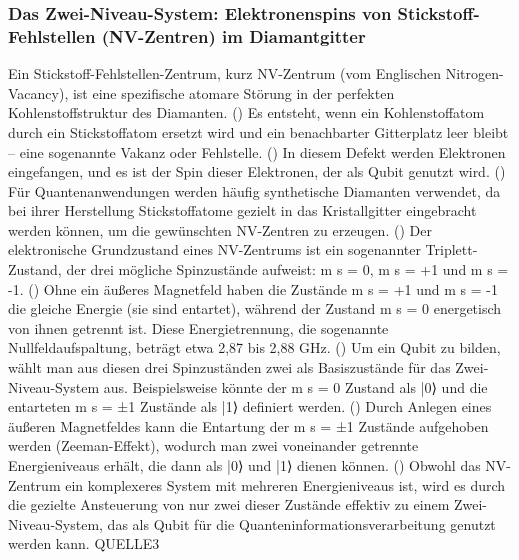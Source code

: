 \subsubsection{Das Zwei-Niveau-System: Elektronenspins von Stickstoff-Fehlstellen (NV-Zentren) im Diamantgitter}
Ein Stickstoff-Fehlstellen-Zentrum, kurz NV-Zentrum (vom Englischen Nitrogen-Vacancy), ist eine spezifische atomare Störung in der perfekten Kohlenstoffstruktur des Diamanten. (\cite{StickstoffFehlstellenZentrum2025}) Es entsteht, wenn ein Kohlenstoffatom durch ein Stickstoffatom ersetzt wird und ein benachbarter Gitterplatz leer bleibt – eine sogenannte Vakanz oder Fehlstelle. (\cite{StickstoffFehlstellenZentrum2025}) In diesem Defekt werden Elektronen eingefangen, und es ist der Spin dieser Elektronen, der als Qubit genutzt wird. (\cite{StickstoffFehlstellenZentrum2025}) Für Quantenanwendungen werden häufig synthetische Diamanten verwendet, da bei ihrer Herstellung Stickstoffatome gezielt in das Kristallgitter eingebracht werden können, um die gewünschten NV-Zentren zu erzeugen. (\cite{StickstoffFehlstellenZentrum2025})
Der elektronische Grundzustand eines NV-Zentrums ist ein sogenannter Triplett-Zustand, der drei mögliche Spinzustände aufweist: m s = 0, m s = +1 und m s = -1. (\cite{StickstoffFehlstellenZentrum2025}) Ohne ein äußeres Magnetfeld haben die Zustände m s = +1 und m s = -1 die gleiche Energie (sie sind entartet), während der Zustand m s = 0 energetisch von ihnen getrennt ist. Diese Energietrennung, die sogenannte Nullfeldaufspaltung, beträgt etwa 2,87 bis 2,88 GHz. (\cite{StickstoffFehlstellenZentrum2025})
Um ein Qubit zu bilden, wählt man aus diesen drei Spinzuständen zwei als Basiszustände für das Zwei-Niveau-System aus. Beispielsweise könnte der m s = 0 Zustand als |0⟩ und die entarteten m s = ±1 Zustände als |1⟩ definiert werden. (\cite{StickstoffFehlstellenZentrum2025}) Durch Anlegen eines äußeren Magnetfeldes kann die Entartung der m s = ±1 Zustände aufgehoben werden (Zeeman-Effekt), wodurch man zwei voneinander getrennte Energieniveaus erhält, die dann als |0⟩ und |1⟩ dienen können. (\cite{StickstoffFehlstellenZentrum2025}) Obwohl das NV-Zentrum ein komplexeres System mit mehreren Energieniveaus ist, wird es durch die gezielte Ansteuerung von nur zwei dieser Zustände effektiv zu einem Zwei-Niveau-System, das als Qubit für die Quanteninformationsverarbeitung genutzt werden kann. QUELLE3
